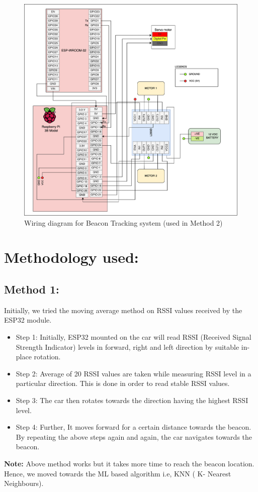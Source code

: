 \begin{figure}[h!]
\centering
\includegraphics[width=\columnwidth]{./Figures/Wiring_beacon.png}
\caption{Wiring diagram for Beacon Tracking system (used in Method 2)}
\label{Wiring_beacon}
\end{figure}

\section{Methodology used:}
\subsection{Method 1:}
Initially, we tried the moving average method on RSSI values received by the ESP32 module.
\begin{itemize}
    \item Step 1: Initially, ESP32 mounted on the car will read RSSI (Received Signal Strength Indicator) levels in forward, right and left direction by suitable in-place rotation.
    
    \item Step 2: Average of 20 RSSI values are taken while measuring RSSI level in a particular direction. This is done in order to read stable RSSI values.
    
    \item Step 3: The car then rotates towards the direction having the highest RSSI level.
    \item Step 4: Further, It moves forward for a certain distance towards the beacon. By repeating the above steps again and again, the car navigates towards the beacon.
\end{itemize}
\textbf{Note:} Above method works but it takes more time to reach the beacon location. Hence, we moved towards the ML based algorithm i.e, KNN ( K- Nearest Neighbours).

